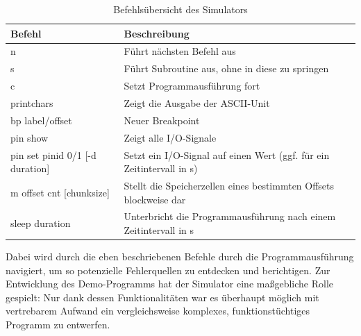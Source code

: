 \begin{table}
\begin{center}
	\begin{tabular}{| l | l |}
	\hline
		\textbf{Befehl} & \textbf{Beschreibung} \\ \hline
		n & F\"uhrt n\"achsten Befehl aus \\ \hline
		s & F\"uhrt Subroutine aus, ohne in diese zu springen\\ \hline
		c & Setzt Programmausf\"uhrung fort \\ \hline
		printchars & Zeigt die Ausgabe der ASCII-Unit\\ \hline
		bp {label/offset} & Neuer Breakpoint\\ \hline
		pin show & Zeigt alle I/O-Signale\\ \hline
		pin set {pinid} {0/1} [-d duration] & Setzt ein I/O-Signal auf einen Wert (ggf. f\"ur ein Zeitintervall in s)\\ \hline
		 m {offset} {cnt} [chunksize] & Stellt die Speicherzellen eines bestimmten Offsets blockweise dar\\ \hline
		 sleep {duration} & Unterbricht die Programmausf\"uhrung nach einem Zeitintervall in s\\ \hline 
	\end{tabular}
\end{center}
\caption{Befehls\"ubersicht des Simulators}
\end{table}

Dabei wird durch die eben beschriebenen Befehle durch die Programmausf\"uhrung navigiert, um so potenzielle Fehlerquellen zu entdecken und berichtigen. Zur Entwicklung des Demo-Programms hat der Simulator eine ma\ss{}gebliche Rolle gespielt: Nur dank dessen Funktionalit\"aten war es \"uberhaupt m\"oglich mit vertrebarem Aufwand ein vergleichsweise komplexes, funktionst\"uchtiges Programm zu entwerfen.

